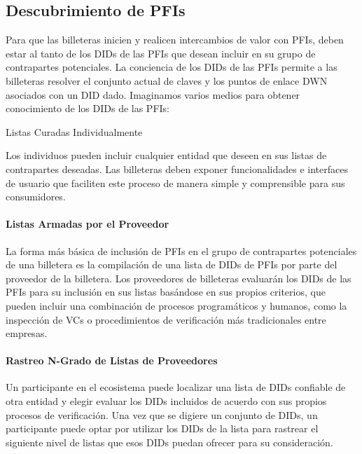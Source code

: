 \documentclass[11pt]{article}
\begin{document}
\vspace{1\baselineskip}
\subsection{Descubrimiento de PFIs}

\vspace{1\baselineskip}
Para que las billeteras inicien y realicen intercambios de valor con PFIs, deben estar al tanto de los DIDs de las PFIs que desean incluir en su grupo de contrapartes potenciales. La conciencia de los DIDs de las PFIs permite a las billeteras resolver el conjunto actual de claves y los puntos de enlace DWN asociados con un DID dado. Imaginamos varios medios para obtener conocimiento de los DIDs de las PFIs:

\vspace{1\baselineskip}
{\Large \textcolor[HTML]{434343}{Listas Curadas Individualmente}}

Los individuos pueden incluir cualquier entidad que deseen en sus listas de contrapartes deseadas. Las billeteras deben exponer funcionalidades e interfaces de usuario que faciliten este proceso de manera simple y comprensible para sus consumidores.

\paragraph{Listas Armadas por el Proveedor}

La forma más básica de inclusión de PFIs en el grupo de contrapartes potenciales de una billetera es la compilación de una lista de DIDs de PFIs por parte del proveedor de la billetera. Los proveedores de billeteras evaluarán los DIDs de las PFIs para su inclusión en sus listas basándose en sus propios criterios, que pueden incluir una combinación de procesos programáticos y humanos, como la inspección de VCs o procedimientos de verificación más tradicionales entre empresas.

\paragraph{Rastreo N-Grado de Listas de Proveedores}

Un participante en el ecosistema puede localizar una lista de DIDs confiable de otra entidad y elegir evaluar los DIDs incluidos de acuerdo con sus propios procesos de verificación. Una vez que se digiere un conjunto de DIDs, un participante puede optar por utilizar los DIDs de la lista para rastrear el siguiente nivel de listas que esos DIDs puedan ofrecer para su consideración.
\end{document}
